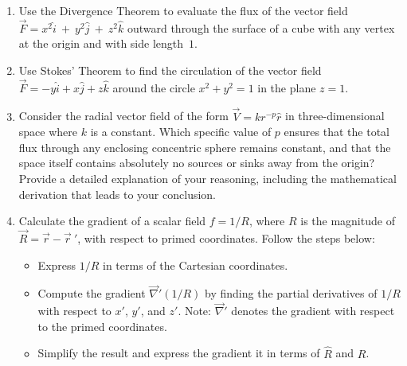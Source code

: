 \documentclass[12pt]{article}
\begin{document}
\begin{enumerate}
    \item Use the Divergence Theorem to evaluate the flux of the vector field $\vec{F} = x^2 \hat{i}~+~y^2 \hat{j}~+~z^2 \hat{k}$ outward through the surface of a cube with any vertex at the origin and with side length~$1$.

    \item Use Stokes' Theorem to find the circulation of the vector field $\vec{F} = -y \hat{i} + x \hat{j} + z \hat{k}$ around the circle $x^2 + y^2 = 1$ in the plane $z = 1$.

    \item Consider the radial vector field of the form $\vec{V} = k r^{-p} \hat{r}$ in three-dimensional space where $k$ is a constant. Which specific value of $p$ ensures that the total flux through any enclosing concentric sphere remains constant, and that the space itself contains absolutely no sources or sinks away from the origin? Provide a detailed explanation of your reasoning, including the mathematical derivation that leads to your conclusion.


    \newpage
    \item Calculate the gradient of a scalar field $f=1/R$, where $R$ is the magnitude of $\vec{R}=\vec{r}-\vec{r}~'$, with respect to primed coordinates. Follow the steps below:
    \begin{itemize}
        \item[(i)] Express $1/R$ in terms of the Cartesian coordinates.
        \item[(ii)] Compute the gradient $\vec{\nabla}'(1/R)$ by finding the partial derivatives of $1/R$ with respect to $x'$, $y'$, and $z'$. Note: $\vec{\nabla}'$ denotes the gradient with respect to the primed coordinates. 
        \item[(iii)] Simplify the result and express the gradient  it in terms of $\hat{R}$ and $R$.
    \end{itemize}

\end{enumerate}
\end{document}
